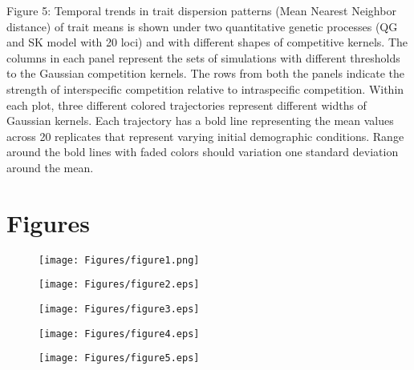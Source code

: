 \documentclass[12pt]{article}
\begin{document}
\noindent Figure 5: Temporal trends in trait dispersion patterns (Mean Nearest Neighbor distance) of trait means is shown under two quantitative genetic processes (QG and SK model with 20 loci) and with different shapes of competitive kernels. The columns in each panel represent the sets of simulations with different thresholds to the Gaussian competition kernels. The rows from both the panels indicate the strength of interspecific competition relative to intraspecific competition. Within each plot, three different colored trajectories represent different widths of Gaussian kernels. Each trajectory has a bold line representing the mean values across 20 replicates that represent varying initial demographic conditions. Range around the bold lines with faded colors should variation one standard deviation around the mean. 


\section{Figures}

\begin{figure}[htb!]
\texttt{[image: Figures/figure1.png]}
\caption{}
\label{fig:cartoon}
\end{figure}

\begin{figure}[htb!]
\hspace{-1 in}\texttt{[image: Figures/figure2.eps]}
\caption{}
\label{fig:cartoon}
\end{figure}

\begin{figure}[htb!]
\hspace{-0.75 in}\texttt{[image: Figures/figure3.eps]}
\caption{}
\label{fig:cartoon}
\end{figure}

\begin{figure}[htb!]
\hspace{-1 in}\texttt{[image: Figures/figure4.eps]}
\caption{}
\label{fig:cartoon}
\end{figure}

\begin{figure}[htb!]
\hspace{-1 in}\texttt{[image: Figures/figure5.eps]}
\caption{}
\label{fig:cartoon}
\end{figure}


\newpage
\end{document}
